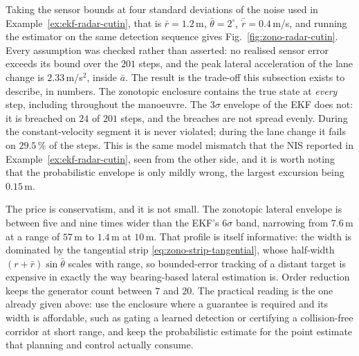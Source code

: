 \begin{example}
Taking the sensor bounds at four standard deviations of the noise used in
Example~\ref{ex:ekf-radar-cutin}, that is $\bar r=1.2$\,m,
$\bar\theta=2^{\circ}$, $\bar{\dot r}=0.4$\,m/s, and running the estimator on
the same detection sequence gives Fig.~\ref{fig:zono-radar-cutin}. Every
assumption was checked rather than asserted: no realised sensor error exceeds
its bound over the $201$ steps, and the peak lateral acceleration of the lane
change is $2.33$\,m/s$^{2}$, inside $\bar a$. The result is the trade-off this
subsection exists to describe, in numbers. The zonotopic enclosure contains the
true state at \emph{every} step, including throughout the manoeuvre. The
$3\sigma$ envelope of the EKF does not: it is breached on $24$ of $201$ steps,
and the breaches are not spread evenly. During the constant-velocity segment it
is never violated; during the lane change it fails on $29.5\,\%$ of the steps.
This is the same model mismatch that the NIS reported in
Example~\ref{ex:ekf-radar-cutin}, seen from the other side, and it is worth
noting that the probabilistic envelope is only mildly wrong, the largest
excursion being $0.15$\,m.

The price is conservatism, and it is not small. The zonotopic lateral envelope
is between five and nine times wider than the EKF's $6\sigma$ band, narrowing
from $7.6$\,m at a range of $57$\,m to $1.4$\,m at $10$\,m. That profile is
itself informative: the width is dominated by the tangential strip
\eqref{eq:zono-strip-tangential}, whose half-width $(r+\bar r)\sin\bar\theta$
scales with range, so bounded-error tracking of a distant target is expensive
in exactly the way bearing-based lateral estimation is. Order reduction keeps
the generator count between $7$ and $20$. The practical reading is the one
already given above: use the enclosure where a guarantee is required and its
width is affordable, such as gating a learned detection or certifying a
collision-free corridor at short range, and keep the probabilistic estimate for
the point estimate that planning and control actually consume.
\end{example}

